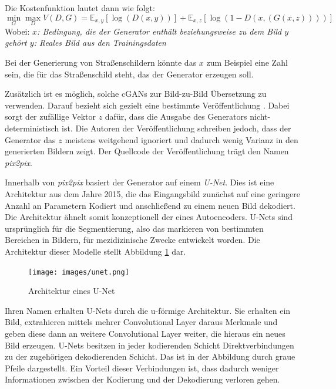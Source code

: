 Die Kostenfunktion lautet dann wie folgt: \cite{pix2pix}
\begin{equation}
   \label{eq:cond_gan}
   \min_{G} \max_{D} V(D,G) = \mathbb{E}_{x, y}[\log(D(x, y))] + \mathbb{E}_{x,z}[\log(1-D(x, (G(x, z))))]
\end{equation}
Wobei: \newline
\emph{\null\quad\quad $x$: Bedingung, die der Generator enthält beziehungsweise zu dem Bild $y$ gehört \newline
\null\quad\quad $y$: Reales Bild aus den Trainingsdaten}

Bei der Generierung von Straßenschildern könnte das $x$ zum Beispiel eine Zahl sein, die für das Straßenschild steht, das der Generator erzeugen soll.

Zusätzlich ist es möglich, solche \acp{cGAN} zur Bild-zu-Bild Übersetzung zu verwenden. Darauf bezieht sich gezielt eine bestimmte Veröffentlichung \cite{pix2pix}. Dabei sorgt der zufällige Vektor $z$ dafür, dass die Ausgabe des Generators nicht-deterministisch ist. Die Autoren der Veröffentlichung schreiben jedoch, dass der Generator das $z$ meistens weitgehend ignoriert und dadurch wenig Varianz in den generierten Bildern zeigt. Der Quellcode der Veröffentlichung trägt den Namen \emph{pix2pix}. \cite{pix2pix}

Innerhalb von \emph{pix2pix} basiert der Generator auf einem \emph{U-Net}. Dies ist eine Architektur aus dem Jahre 2015, die das Eingangsbild zunächst auf eine geringere Anzahl an Parametern Kodiert und anschließend zu einem neuen Bild dekodiert. Die Architektur ähnelt somit konzeptionell der eines Autoencoders. U-Nets sind ursprünglich für die Segmentierung, also das markieren von bestimmten Bereichen in Bildern, für mezidizinische Zwecke entwickelt worden. Die Architektur dieser Modelle stellt Abbildung \ref{fig:unet} dar. \cite{unet} \cite{pix2pix}

\begin{figure}[h]
   \centering
   \texttt{[image: images/unet.png]}
   \caption{Architektur eines U-Net \cite{unet}}
   \label{fig:unet}
\end{figure}

Ihren Namen erhalten U-Nets durch die u-förmige Architektur. Sie erhalten ein Bild, extrahieren mittels mehrer Convolutional Layer daraus Merkmale und geben diese dann an weitere Convolutional Layer weiter, die hieraus ein neues Bild erzeugen. U-Nets besitzen in jeder kodierenden Schicht Direktverbindungen zu der zugehörigen dekodierenden Schicht. Das ist in der Abbildung durch graue Pfeile dargestellt. Ein Vorteil dieser Verbindungen ist, dass dadurch weniger Informationen zwischen der Kodierung und der Dekodierung verloren gehen. \cite{unet}

